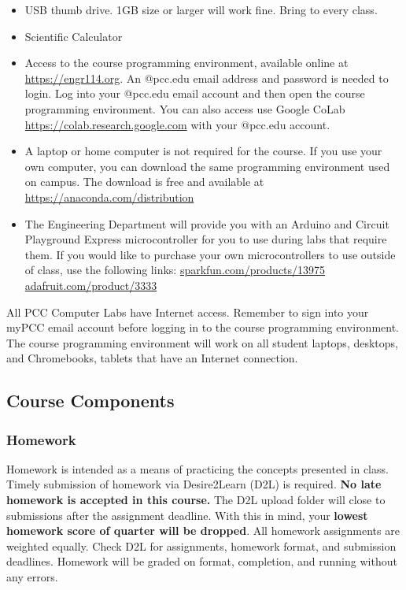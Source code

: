 \documentclass[11pt]{article}
\providecommand{\tightlist}{%
      \setlength{\itemsep}{0pt}\setlength{\parskip}{0pt}}
\begin{document}
\begin{itemize}
\tightlist
\item
  USB thumb drive. 1GB size or larger will work fine. Bring to every
  class.
\item
  Scientific Calculator
\item
  Access to the course programming environment, available online at
  \url{https://engr114.org}. An @pcc.edu email address and password is
  needed to login. Log into your @pcc.edu email account and then open
  the course programming environment. You can also access use Google
  CoLab \url{https://colab.research.google.com} with your @pcc.edu
  account.
\item
  A laptop or home computer is not required for the course. If you use
  your own computer, you can download the same programming environment
  used on campus. The download is free and available at
  \href{https://www.anaconda.com/distribution/}{https://anaconda.com/distribution}
\item
  The Engineering Department will provide you with an Arduino and
  Circuit Playground Express microcontroller for you to use during labs
  that require them. If you would like to purchase your own
  microcontrollers to use outside of class, use the following links:
  \href{https://www.sparkfun.com/products/13975}{sparkfun.com/products/13975}
  \href{https://www.adafruit.com/product/3333}{adafruit.com/product/3333}
\end{itemize}

All PCC Computer Labs have Internet access. Remember to sign into your
myPCC email account before logging in to the course programming
environment. The course programming environment will work on all student
laptops, desktops, and Chromebooks, tablets that have an Internet
connection.

    \hypertarget{course-components}{%
\subsection{Course Components}\label{course-components}}

    \hypertarget{homework}{%
\subsubsection{Homework}\label{homework}}

Homework is intended as a means of practicing the concepts presented in
class. Timely submission of homework via Desire2Learn (D2L) is required.
\textbf{No late homework is accepted in this course.} The D2L upload
folder will close to submissions after the assignment deadline. With
this in mind, your \textbf{lowest homework score of quarter will be
dropped}. All homework assignments are weighted equally. Check D2L for
assignments, homework format, and submission deadlines. Homework will be
graded on format, completion, and running without any errors.
\end{document}
